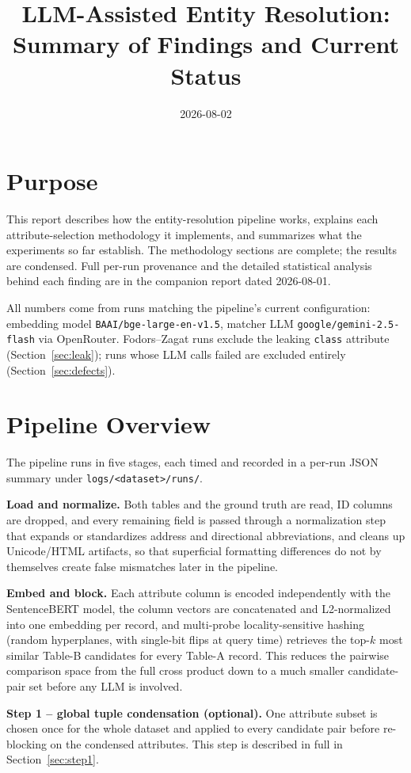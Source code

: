 \documentclass[11pt]{article}
\title{LLM-Assisted Entity Resolution:\\Summary of Findings and Current Status}
\author{}
\date{2026-08-02}
\begin{document}
\maketitle

\section{Purpose}

This report describes how the entity-resolution pipeline works, explains each
attribute-selection methodology it implements, and summarizes what the experiments so
far establish. The methodology sections are complete; the results are condensed. Full
per-run provenance and the detailed statistical analysis behind each finding are in
the companion report dated 2026-08-01.

All numbers come from runs matching the pipeline's current configuration: embedding
model \texttt{BAAI/bge-large-en-v1.5}, matcher LLM \texttt{google/gemini-2.5-flash} via
OpenRouter. Fodors--Zagat runs exclude the leaking \texttt{class} attribute
(Section~\ref{sec:leak}); runs whose LLM calls failed are excluded entirely
(Section~\ref{sec:defects}).

\section{Pipeline Overview}

The pipeline runs in five stages, each timed and recorded in a per-run JSON summary
under \texttt{logs/<dataset>/runs/}.

\textbf{Load and normalize.} Both tables and the ground truth are read, ID columns
are dropped, and every remaining field is passed through a normalization step that
expands or standardizes address and directional abbreviations, and cleans up
Unicode/HTML artifacts, so that superficial formatting differences do not by
themselves create false mismatches later in the pipeline.

\textbf{Embed and block.} Each attribute column is encoded independently with the
SentenceBERT model, the column vectors are concatenated and L2-normalized into one
embedding per record, and multi-probe locality-sensitive hashing (random
hyperplanes, with single-bit flips at query time) retrieves the top-$k$ most similar
Table-B candidates for every Table-A record. This reduces the pairwise comparison
space from the full cross product down to a much smaller candidate-pair set before
any LLM is involved.

\textbf{Step 1 -- global tuple condensation (optional).} One attribute subset is
chosen once for the whole dataset and applied to every candidate pair before
re-blocking on the condensed attributes. This step is described in full in
Section~\ref{sec:step1}.
\end{document}
